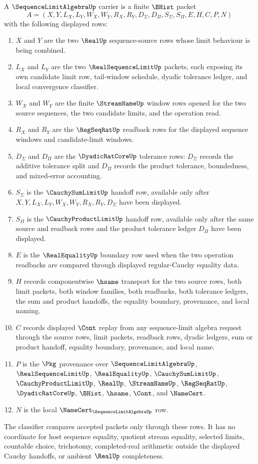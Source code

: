 \begin{definition}
\label{def:sequence-limit-algebra-carrier}
A $\SequenceLimitAlgebraUp$ carrier is a finite $\BHist$ packet
$$
A=(X,Y,L_X,L_Y,W_X,W_Y,R_X,R_Y,D_{\Sigma},D_{\Pi},S_{\Sigma},S_{\Pi},E,H,C,P,N)
$$
with the following displayed rows:
\begin{enumerate}
\item $X$ and $Y$ are the two $\RealUp$ sequence-source rows whose limit behaviour is being combined.
\item $L_X$ and $L_Y$ are the two $\RealSequenceLimitUp$ packets, each exposing its own candidate limit row, tail-window schedule, dyadic tolerance ledger, and local convergence classifier.
\item $W_X$ and $W_Y$ are the finite $\StreamNameUp$ window rows opened for the two source sequences, the two candidate limits, and the operation read.
\item $R_X$ and $R_Y$ are the $\RegSeqRatUp$ readback rows for the displayed sequence windows and candidate-limit windows.
\item $D_{\Sigma}$ and $D_{\Pi}$ are the $\DyadicRatCoreUp$ tolerance rows: $D_{\Sigma}$ records the additive tolerance split and $D_{\Pi}$ records the product tolerance, boundedness, and mixed-error accounting.
\item $S_{\Sigma}$ is the $\CauchySumLimitUp$ handoff row, available only after $X,Y,L_X,L_Y,W_X,W_Y,R_X,R_Y,D_{\Sigma}$ have been displayed.
\item $S_{\Pi}$ is the $\CauchyProductLimitUp$ handoff row, available only after the same source and readback rows and the product tolerance ledger $D_{\Pi}$ have been displayed.
\item $E$ is the $\RealEqualityUp$ boundary row used when the two operation readbacks are compared through displayed regular-Cauchy equality data.
\item $H$ records componentwise $\hsame$ transport for the two source rows, both limit packets, both window families, both readbacks, both tolerance ledgers, the sum and product handoffs, the equality boundary, provenance, and local naming.
\item $C$ records displayed $\Cont$ replay from any sequence-limit algebra request through the source rows, limit packets, readback rows, dyadic ledgers, sum or product handoff, equality boundary, provenance, and local name.
\item $P$ is the $\Pkg$ provenance over $\SequenceLimitAlgebraUp$, $\RealSequenceLimitUp$, $\RealEqualityUp$, $\CauchySumLimitUp$, $\CauchyProductLimitUp$, $\RealUp$, $\StreamNameUp$, $\RegSeqRatUp$, $\DyadicRatCoreUp$, $\BHist$, $\hsame$, $\Cont$, and $\NameCert$.
\item $N$ is the local $\NameCert_{\SequenceLimitAlgebraUp}$ row.
\end{enumerate}
The classifier compares accepted packets only through these rows. It has no coordinate for host sequence equality, quotient stream equality, selected limits, countable choice, trichotomy, completed-real arithmetic outside the displayed Cauchy handoffs, or ambient $\RealUp$ completeness.
\end{definition}

